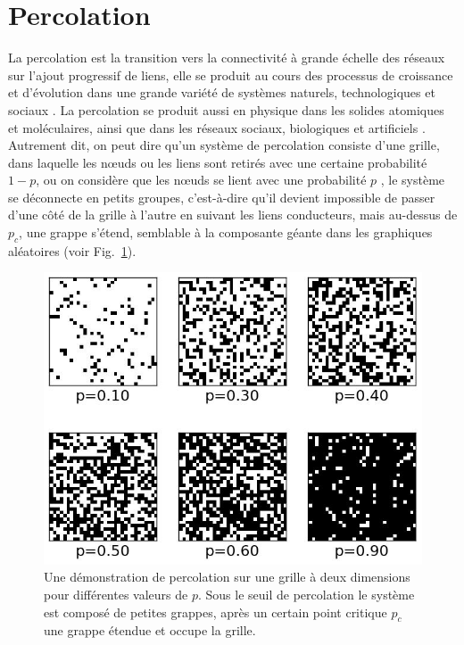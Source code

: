 \section{Percolation}
La percolation est la transition vers la connectivité à grande échelle des réseaux sur l'ajout progressif de liens, elle se produit au cours des processus de croissance et d'évolution dans une grande variété de systèmes naturels, technologiques et sociaux \cite{Strogatz2001,Newman-al2002,Song-al2006,Parshani-al2010,Parshani2-al2010,Ben-Avraham-Havlin2001,Saberi2015}. La percolation se produit aussi en physique dans les solides atomiques et moléculaires, ainsi que dans les réseaux sociaux, biologiques et artificiels \cite{Newman-al2002,Dorogovtsev-al2008,Rozenfeld-al2010}. Autrement dit, on peut dire qu'un système de percolation consiste d'une grille, dans laquelle les nœuds ou les liens sont retirés avec une certaine probabilité $1-p$, ou on considère que les nœuds se lient avec une probabilité $p$ \cite{Bunde-Havlin1996,Stauffer-Aharony1994}, le système se déconnecte en petits groupes, c'est-à-dire qu'il devient impossible de passer d'une côté de la grille à l'autre en suivant les liens conducteurs, mais au-dessus de $p_c$, une grappe s'étend, semblable à la composante géante dans les graphiques aléatoires (voir Fig.~\ref{percolation}).

\begin{figure}[h!]
	\centering
	\includegraphics[scale=0.5]{./figures/percolation}
	\caption{Une démonstration de percolation sur une grille à deux dimensions pour différentes valeurs de $p$. Sous le seuil de percolation le système est composé de petites grappes, après un certain point critique $p_c$ une grappe étendue et occupe la grille.}
	\label{percolation}
\end{figure}
